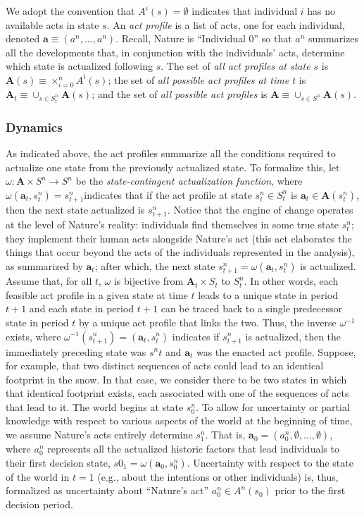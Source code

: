 \documentclass[
11pt,
titlepage,
reqno,
]{article}%
\theoremstyle{definition}
\begin{document}
We adopt the convention that $A^i(s)=\emptyset$ indicates that individual $i$ has no available acts in state $s$.
An \textit{act profile} is a list of acts, one for each individual, denoted  $\mathbf{a}\equiv(a^n,\ldots,a^n)$. 
Recall, Nature is ``Individual 0'' so that $a^n$ summarizes all the developments that, in conjunction with the individuals' acts, determine which state is actualized following $s$. 
The set of \textit{all act profiles at state $s$} is $\mathbf{A}(s)\equiv \times_{i=0}^n A^i(s)$; the set of \textit{all possible act profiles at time $t$} is  $\mathbf{A}_t\equiv \cup_{s\in S^n_t} \mathbf{A}(s)$; and the set of \textit{all possible act profiles} is $\mathbf{A}\equiv \cup_{s\in S^n} \mathbf{A}(s)$. 


\subsubsection{Dynamics  } 
  
As indicated above, the act profiles summarize all the conditions required to actualize one state from the previously actualized state. 
To formalize this, let $\omega:\mathbf{A}\times S^n\rightarrow S^n$ be the \textit{state-contingent actualization function}, where $\omega(\mathbf{a}_t,s^n_t)=s^n_{t+1}$indicates that if the act profile at state $s^n_t\in S^n_t$ is $\mathbf{a}_t\in \mathbf{A}(s^n_t)$, then the next state actualized is $s^n_{t+1}$.
Notice that the engine of change operates at the level of Nature's reality: individuals find themselves in some true state $s^n_t$; 
they implement their human acts alongside Nature's act (this act elaborates the things that occur beyond the acts of the individuals represented in the analysis), as summarized by $\mathbf{a}_t$;
after which, the next state $s^n_{t+1}=\omega(\mathbf{a}_t,s^n_t)$ is actualized. 
Assume that, for all $t$, $\omega$ is bijective from $\mathbf{A}_t\times S_t$ to $S^n_t$.
In other words, each feasible  act profile in a given state at time $t$ leads to a unique state in period $t+1$ and each state in period $t+1$ can be traced back to a single predecessor state in period $t$ by a unique act profile that links the two.
Thus, the inverse $\omega^{-1}$ exists, where $\omega^{-1}(s^n_{t+1})=(\mathbf{a}_t,s^n_t)$ indicates if $s^n_{t+1}$ is actualized, then the immediately preceding state was $s^nt$ and $\mathbf{a}_t$ was the enacted act profile.
Suppose, for example, that two distinct sequences of acts could lead to an identical footprint in the snow.
In that case, we consider there to be two states in which that identical footprint exists, each associated with one of the sequences of acts that lead to it. 
The world begins at state $s_0^n$.
To allow for uncertainty or partial knowledge with respect to various aspects of the world at the beginning of time, we assume Nature's acts entirely determine $s^n_{1}$. 
That is, $\mathbf{a}_0=(a^n_0,\emptyset,\ldots,\emptyset)$, where $a^n_0$ represents all the actualized historic factors that lead individuals to their  first decision state, $s0_1=\omega(\mathbf{a}_0,s^n_0)$.
Uncertainty with respect to the state of the world in $t=1$ (e.g., about the intentions or other individuals) is, thus, formalized as uncertainty about ``Nature's act'' $a^n_0\in A^n(s_0)$ prior to the first decision period.
\end{document}
